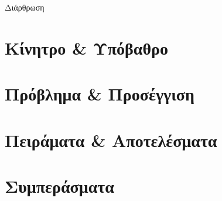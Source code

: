 \documentclass[aspectratio=169,10pt]{beamer}
\begin{document}
\begin{frame}[plain]
  \maketitle
\end{frame}

\begin{frame}{Διάρθρωση}
  \tableofcontents[hideallsubsections]
\end{frame}

\section{Κίνητρο \& Υπόβαθρο}




\section{Πρόβλημα \& Προσέγγιση}






\section{Πειράματα \& Αποτελέσματα}




\section{Συμπεράσματα}



\appendix

\end{document}
